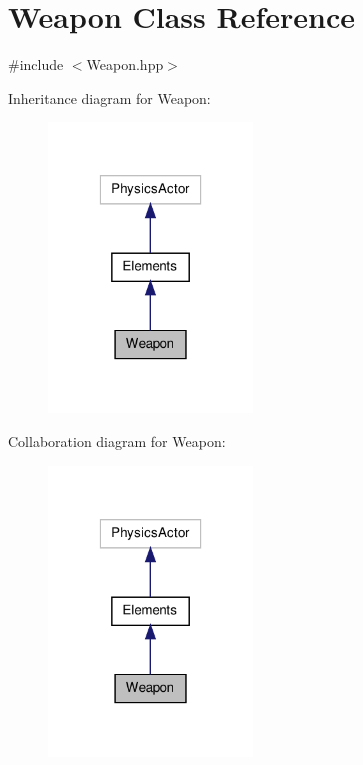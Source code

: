 \hypertarget{class_weapon}{\section{Weapon Class Reference}
\label{class_weapon}
}


{\ttfamily \#include $<$Weapon.\-hpp$>$}



Inheritance diagram for Weapon\-:\nopagebreak
\begin{figure}[H]
\begin{center}
\leavevmode
\includegraphics[width=154pt]{class_weapon__inherit__graph}
\end{center}
\end{figure}


Collaboration diagram for Weapon\-:\nopagebreak
\begin{figure}[H]
\begin{center}
\leavevmode
\includegraphics[width=154pt]{class_weapon__coll__graph}
\end{center}
\end{figure}
